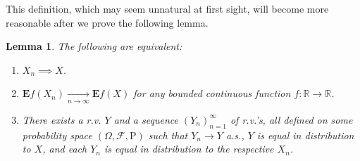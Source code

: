 \documentclass[11pt]{report}
\providecommand{\cal}{\mathcal}
\newcommand{\R}{\mathbb{R}}
\theoremstyle{plain}
\newtheorem{lem}[thm]{Lemma}
\theoremstyle{definition}
\begin{document}
This definition, which may seem unnatural at first
sight, will become more reasonable after we prove the
following lemma.

\begin{lem}
The following are equivalent:

\begin{enumerate}[label=\arabic*.]
\item $X_n \implies X$.

\item $\mathbf{E} f(X_n) \xrightarrow[n\to\infty]{}
\mathbf{E} f(X)$
for any bounded continuous function $f:\R\to\R$.

\item There exists a r.v. $Y$ and a sequence
$(Y_n)_{n=1}^\infty$ of r.v.'s, all defined on some
probability space $(\Omega, {\cal F}, \mathrm{P})$
such that $Y_n \to Y$ a.s., $Y$ is equal in
distribution to $X$, and each $Y_n$ is equal in
distribution to the respective $X_n$.
\end{enumerate}

\end{lem}
\end{document}
